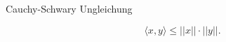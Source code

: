 \documentclass[class=article, crop=false]{standalone}
\begin{document}
\begin{zettel}{Cauchy-Schwary Ungleichung}
\begin{flashcard}
    \begin{lemma}
    \[
        \langle x,y\rangle \leq ||x|| \cdot ||y||
    .\]
    \end{lemma}
\end{flashcard}
\end{zettel}
\end{document}
